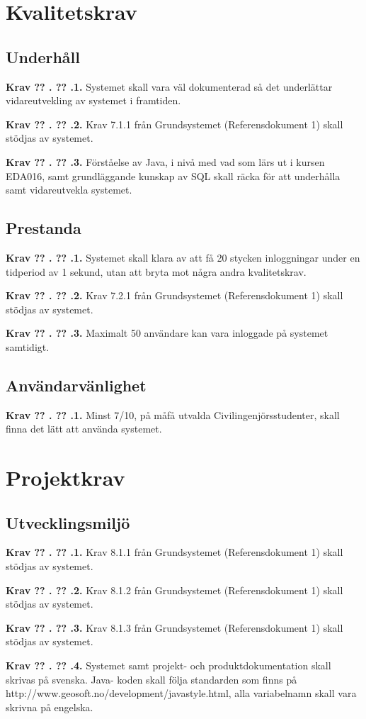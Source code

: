 \documentclass[a4paper]{article}
\newcommand\getcurrentref[1]{%
 \ifnumequal{\value{#1}}{0}
  {??}
  {\the\value{#1}}%
}
\newcommand\requirement[2]{
	\numberedrow{Krav}{#1}{#2}
}
\newcommand\numberedrow[3]{
	\noindent
	\textbf{#1 \getcurrentref{section}.\getcurrentref{subsection}.#2.} #3
	
}
\begin{document}
\section{Kvalitetskrav}
	\subsection{Underhåll}
		\requirement{1}{Systemet skall vara väl dokumenterad så det underlättar vidareutvekling av systemet i framtiden.}
		\requirement{2}{Krav 7.1.1 från Grundsystemet (Referensdokument 1) skall stödjas av systemet.}
		\requirement{3}{Förståelse av Java, i nivå med vad som lärs ut i kursen EDA016, samt grundläggande kunskap av SQL skall räcka för att underhålla samt vidareutvekla systemet.}



	\subsection{Prestanda}
		\label{krav-kval-pres}
		\requirement{1}{Systemet skall klara av att få 20 stycken inloggningar under en tidperiod av 1 sekund, utan att bryta mot några andra kvalitetskrav.}
		\requirement{2}{Krav 7.2.1 från Grundsystemet (Referensdokument 1) skall stödjas av systemet.}
		\requirement{3}{Maximalt 50 användare kan vara inloggade på systemet samtidigt.}

	\subsection{Användarvänlighet}
		\requirement{1}{Minst 7/10, på måfå utvalda Civilingenjörsstudenter, skall finna det lätt att använda systemet.}

\section{Projektkrav}
	\subsection{Utvecklingsmiljö}
	\requirement{1}{Krav 8.1.1 från Grundsystemet (Referensdokument 1) skall stödjas av systemet.}
	\requirement{2}{Krav 8.1.2 från Grundsystemet (Referensdokument 1) skall stödjas av systemet.}
	\requirement{3}{Krav 8.1.3 från Grundsystemet (Referensdokument 1) skall stödjas av systemet.}
	\requirement{4}{Systemet samt projekt- och produktdokumentation skall skrivas på svenska. Java- koden skall följa standarden som finns på http://www.geosoft.no/development/javastyle.html, alla variabelnamn skall vara skrivna på engelska.}
\end{document}
